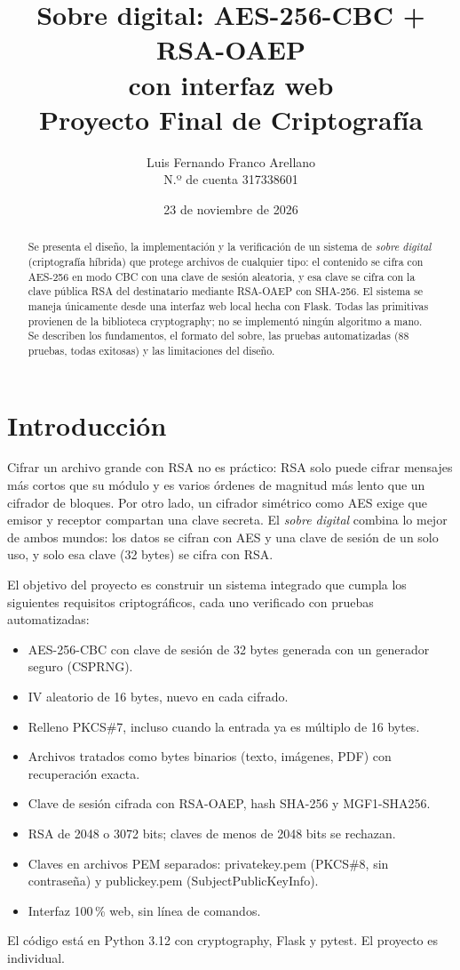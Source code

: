 \documentclass[11pt,a4paper]{article}
\title{\textbf{Sobre digital: AES-256-CBC + RSA-OAEP\\con interfaz web}\\[0.4em]
\large Proyecto Final de Criptografía}
\author{Luis Fernando Franco Arellano\\ N.º de cuenta 317338601}
\date{23 de noviembre de 2026}
\newcommand{\cod}[1]{{\ttfamily\let\_\relax\def\_{\textunderscore\penalty0\hskip0pt\relax}\def\/{\slash\penalty0\hskip0pt\relax}#1}}
\begin{document}
\maketitle
\begin{abstract}
Se presenta el diseño, la implementación y la verificación de un sistema de \emph{sobre digital}
(criptografía híbrida) que protege archivos de cualquier tipo: el contenido se cifra con AES-256 en modo CBC
con una clave de sesión aleatoria, y esa clave se cifra con la clave pública RSA del destinatario mediante
RSA-OAEP con SHA-256. El sistema se maneja únicamente desde una interfaz web local hecha con Flask. Todas las
primitivas provienen de la biblioteca \cod{cryptography}; no se implementó ningún algoritmo a mano. Se
describen los fundamentos, el formato del sobre, las pruebas automatizadas (88 pruebas, todas exitosas) y
las limitaciones del diseño.
\end{abstract}
\tableofcontents
\newpage

\section{Introducción}
Cifrar un archivo grande con RSA no es práctico: RSA solo puede cifrar mensajes más cortos que su módulo y
es varios órdenes de magnitud más lento que un cifrador de bloques. Por otro lado, un cifrador simétrico como
AES exige que emisor y receptor compartan una clave secreta. El \emph{sobre digital} combina lo mejor de
ambos mundos: los datos se cifran con AES y una clave de sesión de un solo uso, y solo esa clave (32 bytes)
se cifra con RSA.

El objetivo del proyecto es construir un sistema integrado que cumpla los siguientes requisitos
criptográficos, cada uno verificado con pruebas automatizadas:
\begin{itemize}
  \item AES-256-CBC con clave de sesión de 32 bytes generada con un generador seguro (CSPRNG).
  \item IV aleatorio de 16 bytes, nuevo en cada cifrado.
  \item Relleno PKCS\#7, incluso cuando la entrada ya es múltiplo de 16 bytes.
  \item Archivos tratados como bytes binarios (texto, imágenes, PDF) con recuperación exacta.
  \item Clave de sesión cifrada con RSA-OAEP, hash SHA-256 y MGF1-SHA256.
  \item RSA de 2048 o 3072 bits; claves de menos de 2048 bits se rechazan.
  \item Claves en archivos PEM separados: \cod{private\_key.pem} (PKCS\#8, sin contraseña) y
        \cod{public\_key.pem} (SubjectPublicKeyInfo).
  \item Interfaz 100\,\% web, sin línea de comandos.
\end{itemize}
El código está en Python 3.12 con \cod{cryptography}, Flask y pytest. El proyecto es individual.
\end{document}
